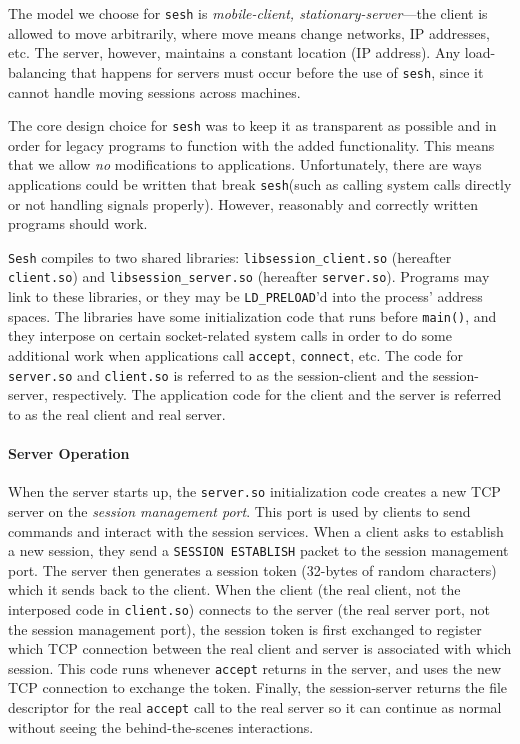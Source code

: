 \documentclass[twocolumn,11pt]{article}
\newcommand{\sesh}{\texttt{sesh}\xspace}
\newcommand{\Sesh}{\texttt{Sesh}\xspace}
\begin{document}
The model we choose for \sesh is \textit{mobile-client, stationary-server}---the
client is allowed to move arbitrarily, where move means change networks, IP
addresses, etc. The server, however, maintains a constant location (IP address).
Any load-balancing that happens for servers must occur before the use of \sesh,
since it cannot handle moving sessions across machines.

The core design choice for \sesh was to keep it as transparent as possible and
in order for legacy programs to function with the added functionality. This
means that we allow \textit{no} modifications to applications. Unfortunately,
there are ways applications could be written that break \sesh (such as calling
system calls directly or not handling signals properly). However, reasonably and
correctly written programs should work.

\newcommand{\clientso}{\texttt{client.so}\xspace}
\newcommand{\serverso}{\texttt{server.so}\xspace}

\Sesh compiles to two shared libraries: \texttt{libsession\_client.so}
(hereafter \clientso) and \texttt{libsession\_server.so} (hereafter \serverso).
Programs may link to these libraries, or they may be \texttt{LD\_PRELOAD}'d into
the process' address spaces. The libraries have some initialization code that
runs before \texttt{main()}, and they interpose on certain socket-related system
calls in order to do some additional work when applications call
\texttt{accept}, \texttt{connect}, etc. The code for \serverso and \clientso is
referred to as the session-client and the session-server, respectively. The
application code for the client and the server is referred to as the real client
and real server.

\paragraph{Server Operation}
When the server starts up, the \serverso initialization code creates a new TCP
server on the \textit{session management port}. This port is used by clients to
send commands and interact with the session services.
When a client asks to
establish a new session, they send a \texttt{SESSION ESTABLISH} packet to the
session management port. The server then generates a session token (32-bytes of
random characters) which it sends back to the client. When the client (the real
client, not the interposed code in \clientso) connects to the server (the real
server port, not the session management port), the session token is first
exchanged to register which TCP connection between the real client and server is
associated with which session. This code runs whenever \texttt{accept} returns
in the server, and uses the new TCP connection to exchange the token. Finally,
the session-server returns the file descriptor for the real \texttt{accept} call to the
real server so it can continue as normal without seeing the behind-the-scenes
interactions.
\end{document}
